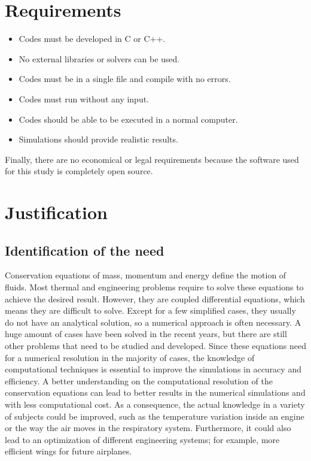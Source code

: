 \section{Requirements}
\begin{itemize}
	\item Codes must be developed in C or C++.
	\item No external libraries or solvers can be used.
	\item Codes must be in a single file and compile with no errors.
	\item Codes must run without any input.
	\item Codes should be able to be executed in a normal computer.
	\item Simulations should provide realistic results.
\end{itemize}
Finally, there are no economical or legal requirements because the software used for this study is completely open source.

\section{Justification}
\subsection{Identification of the need}
Conservation equations of mass, momentum and energy define the motion of fluids. Most thermal and engineering problems require to solve these equations to achieve the desired result. However, they are coupled differential equations, which means they are difficult to solve. Except for a few simplified cases, they usually do not have an analytical solution, so a numerical approach is often necessary. A huge amount of cases have been solved in the recent years, but there are still other problems that need to be studied and developed.
\newline
\newline
Since these equations need for a numerical resolution in the majority of cases, the knowledge of computational techniques is essential to improve the simulations in accuracy and efficiency. A better understanding on the computational resolution of the conservation equations can lead to better results in the numerical simulations and with less computational cost. As a consequence, the actual knowledge in a variety of subjects could be improved, such as the temperature variation inside an engine or the way the air moves in the respiratory system. Furthermore, it could also lead to an optimization of different engineering systems; for example, more efficient wings for future airplanes.

